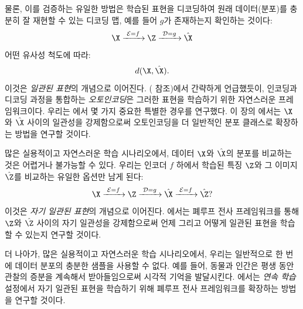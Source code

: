 \documentclass[../../book-main_ko.tex]{subfiles}
\begin{document}
물론, 이를 검증하는 유일한 방법은 학습된 표현을 디코딩하여 원래 데이터(분포)를 충분히 잘 재현할 수 있는 디코딩 맵, 예를 들어 $g$가 존재하는지 확인하는 것이다:
\begin{equation}
  \X
  \xrightarrow{\hspace{1mm} \mathcal{E} = f \hspace{1mm}} \Z
  \xrightarrow{\hspace{1mm} \mathcal{D} = g \hspace{1mm}} \hat{\X}
\end{equation}
어떤 유사성 척도에 따라:
\begin{equation}
  d(\X, \hat \X).
\end{equation}
이것은 {\em 일관된 표현}의 개념으로 이어진다. ( 참조)에서 간략하게 언급했듯이, 인코딩과 디코딩 과정을 통합하는 {\em 오토인코딩}은 그러한 표현을 학습하기 위한 자연스러운 프레임워크이다. 우리는 에서 몇 가지 중요한 특별한 경우를 연구했다. 이 장의 에서는 $\X$와 $\hat \X$ 사이의 일관성을 강제함으로써 오토인코딩을 더 일반적인 분포 클래스로 확장하는 방법을 연구할 것이다.

많은 실용적이고 자연스러운 학습 시나리오에서, 데이터 $\X$와 $\hat \X$의 분포를 비교하는 것은 어렵거나 불가능할 수 있다. 우리는 인코더 $f$ 하에서 학습된 특징 $\Z$와 그 이미지 $\hat \Z$를 비교하는 유일한 옵션만 남게 된다:
\begin{equation}
 \X
\xrightarrow{\hspace{1mm} \mathcal{E} = f \hspace{1mm}} \Z  \xrightarrow{\hspace{1mm} \mathcal{D} = g \hspace{1mm}} \hat{\X} \xrightarrow{\hspace{1mm} \mathcal{E} = f \hspace{1mm}} \hat \Z?
\end{equation}
이것은 {\em 자기 일관된 표현}의 개념으로 이어진다. 에서는 폐루프 전사 프레임워크를 통해 $\Z$와 $\hat \Z$ 사이의 자기 일관성을 강제함으로써 언제 그리고 어떻게 일관된 표현을 학습할 수 있는지 연구할 것이다.

더 나아가, 많은 실용적이고 자연스러운 학습 시나리오에서, 우리는 일반적으로 한 번에 데이터 분포의 충분한 샘플을 사용할 수 없다. 예를 들어, 동물과 인간은 평생 동안 관찰의 증분을 계속해서 받아들임으로써 시각적 기억을 발달시킨다. 에서는 {\em 연속 학습} 설정에서 자기 일관된 표현을 학습하기 위해 폐루프 전사 프레임워크를 확장하는 방법을 연구할 것이다.
\end{document}
